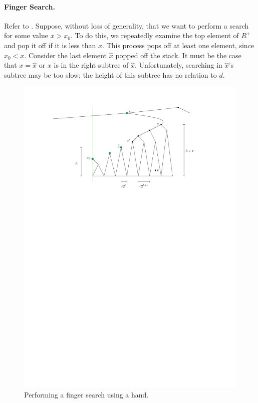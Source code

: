 \documentclass{patmorin}
\makeatletter
\def\ScaleIfNeeded{%
\ifdim\Gin@nat@width>.97\linewidth
.97\linewidth
\else
\Gin@nat@width
\fi
}
\makeatother
\begin{document}
\paragraph{Finger Search.}
Refer to .
Suppose, without loss of generality, that we want to perform a search for
some value $x>x_0$.  To do this, we repeatedly examine the top element
of $R^+$ and pop it off if it is less than $x$.  This process pops off
at least one element, since $x_0<x$.  Consider the last element $\hat
x$ popped off the stack.  It must be the case that $x=\hat x$ or $x$
is in the right subtree of $\hat x$.  Unfortunately, searching in $\hat
x$'s subtree may be too slow; the height of this subtree has no relation
to $d$.

\begin{figure}
  \begin{center}
    \includegraphics[width=\ScaleIfNeeded]{hand-search}
  \end{center}
  \caption{Performing a finger search using a hand.}
\end{figure}
\end{document}
